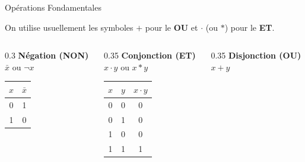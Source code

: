 \begin{frame}{Opérations Fondamentales}

    On utilise usuellement les symboles \(+\) pour le \textbf{OU} et \(\cdot\) (ou \(*\)) pour le \textbf{ET}.

    \vspace{0.3cm}

    \begin{columns}[T]
        \begin{column}{0.3\textwidth}
            \centering
            \textbf{Négation (NON)}\\
            \(\bar{x}\) ou \(\neg x\)
            \vspace{0.2cm}

            \begin{tabular}{|c|c|}
                \hline
                \(x\) & \(\bar{x}\) \\
                \hline
                0 & 1 \\
                1 & 0 \\
                \hline
            \end{tabular}
        \end{column}

        \begin{column}{0.35\textwidth}
            \centering
            \textbf{Conjonction (ET)}\\
            \(x \cdot y\) ou \(x * y\)
            \vspace{0.2cm}

            \begin{tabular}{|c|c|c|}
                \hline
                \(x\) & \(y\) & \(x \cdot y\) \\
                \hline
                0 & 0 & 0 \\
                0 & 1 & 0 \\
                1 & 0 & 0 \\
                1 & 1 & 1 \\
                \hline
            \end{tabular}
        \end{column}

        \begin{column}{0.35\textwidth}
            \centering
            \textbf{Disjonction (OU)}\\
            \(x + y\)
            \vspace{0.2cm}


\end{column}
\end{columns}
\end{frame}
